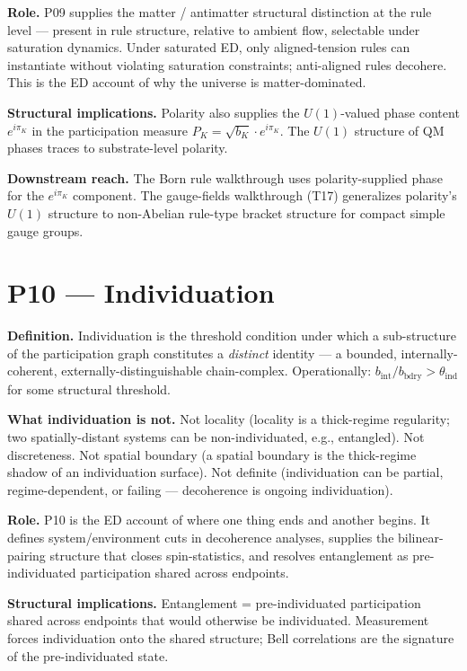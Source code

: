 \documentclass[11pt,a4paper]{article}
\begin{document}
\textbf{Role.} P09 supplies the matter / antimatter structural distinction at the rule level --- present in rule structure, relative to ambient flow, selectable under saturation dynamics. Under saturated ED, only aligned-tension rules can instantiate without violating saturation constraints; anti-aligned rules decohere. This is the ED account of why the universe is matter-dominated.

\textbf{Structural implications.} Polarity also supplies the $U(1)$-valued phase content $e^{i\pi_K}$ in the participation measure $P_K = \sqrt{b_K} \cdot e^{i\pi_K}$. The $U(1)$ structure of QM phases traces to substrate-level polarity.

\textbf{Downstream reach.} The Born rule walkthrough uses polarity-supplied phase for the $e^{i\pi_K}$ component. The gauge-fields walkthrough (T17) generalizes polarity's $U(1)$ structure to non-Abelian rule-type bracket structure for compact simple gauge groups.

\section{P10 --- Individuation}

\textbf{Definition.} Individuation is the threshold condition under which a sub-structure of the participation graph constitutes a \emph{distinct} identity --- a bounded, internally-coherent, externally-distinguishable chain-complex. Operationally: $b_\mathrm{int}/b_\mathrm{bdry} > \theta_\mathrm{ind}$ for some structural threshold.

\textbf{What individuation is not.} Not locality (locality is a thick-regime regularity; two spatially-distant systems can be non-individuated, e.g., entangled). Not discreteness. Not spatial boundary (a spatial boundary is the thick-regime shadow of an individuation surface). Not definite (individuation can be partial, regime-dependent, or failing --- decoherence is ongoing individuation).

\textbf{Role.} P10 is the ED account of where one thing ends and another begins. It defines system/environment cuts in decoherence analyses, supplies the bilinear-pairing structure that closes spin-statistics, and resolves entanglement as pre-individuated participation shared across endpoints.

\textbf{Structural implications.} Entanglement = pre-individuated participation shared across endpoints that would otherwise be individuated. Measurement forces individuation onto the shared structure; Bell correlations are the signature of the pre-individuated state.
\end{document}
